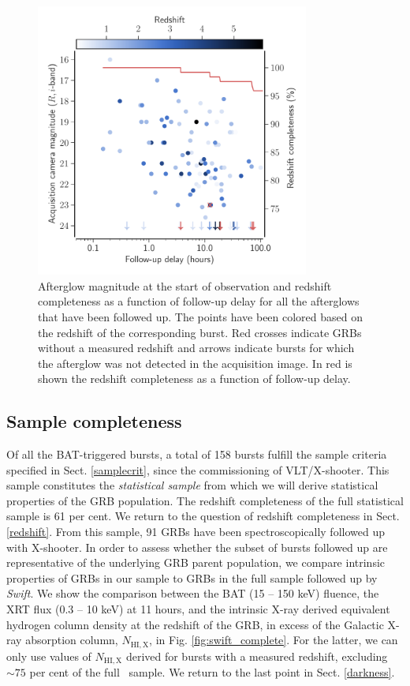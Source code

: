 \documentclass{aa}    %
\begin{document}
\begin{figure}
	\centerline{\includegraphics[width=9cm]{figures/timing.pdf}} \caption{Afterglow
	magnitude at the start of observation and redshift completeness as a function
	of follow-up delay for all the afterglows that have been followed up. The
	points have been colored based on the redshift of the corresponding burst. Red
	crosses indicate GRBs without a measured redshift and arrows indicate bursts
	for which the afterglow was not detected in the acquisition image. In red is
	shown the redshift completeness as a function of follow-up delay.}
\label{fig:timing}
\end{figure}
\subsection{Sample completeness} \label{completeness}

Of all the BAT-triggered bursts, a total of 158 bursts fulfill the sample
criteria specified in Sect. \ref{samplecrit}, since the commissioning of
VLT/X-shooter. This sample constitutes the \textit{statistical sample} from
which we will derive statistical properties of the GRB population. The redshift
completeness of the full statistical sample is 61 per cent. We return to the
question of redshift completeness in Sect. \ref{redshift}. From this sample, 91
GRBs have been spectroscopically followed up with X-shooter. In order to assess
whether the subset of bursts followed up are representative of the underlying
GRB parent population, we compare intrinsic properties of GRBs in our sample to
GRBs in the full sample followed up by \textit{Swift}. We show the comparison
between the BAT (15 -- 150 keV) fluence, the XRT flux (0.3 -- 10 keV) at 11
hours, and the intrinsic X-ray derived equivalent hydrogen column density at the
redshift of the GRB, in excess of the Galactic X-ray absorption column,
$N_{\mathrm{HI,X}}$, in Fig. \ref{fig:swift_complete}. For the latter, we can
only use values of $N_{\mathrm{HI,X}}$ derived for bursts with a measured
redshift, excluding $\sim 75$ per cent of the full \swift~sample. We return to
the last point in Sect. \ref{darkness}.
\end{document}
